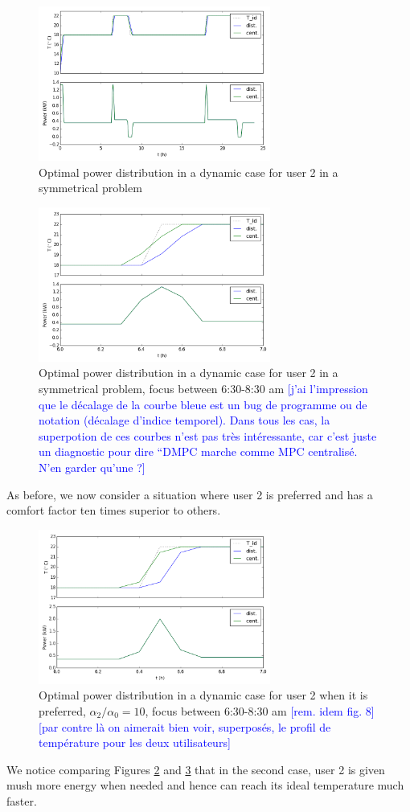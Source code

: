 \documentclass[conference]{IEEEtran}
\edef\hc{\string:}
\newcommand{\rem}[1]{\textcolor{blue}{[#1]}}
\begin{document}
\begin{figure}[H]
\centering
\includegraphics[width=3in]{dynDMPC_init.png}
\caption{Optimal power distribution in a dynamic case for user 2 in a symmetrical problem}
\label{dynDPBinit}
\end{figure}
\begin{figure}[H]
\centering
\includegraphics[width=3in]{dynDMPC_initZOOM.png}
\caption{Optimal power distribution in a dynamic case for user 2 in a symmetrical problem, focus between 6\hc 30-8\hc 30 am
\rem{j'ai l'impression que le décalage de la courbe bleue est un bug de programme ou de notation (décalage d'indice temporel).
Dans tous les cas, la superpotion de ces courbes n'est pas très intéressante, car c'est juste un diagnostic pour dire ``DMPC marche comme MPC centralisé. N'en garder qu'une ?}
}
\label{dynDPBinit}
\end{figure}

As before, we now consider a situation where user 2 is preferred and has a comfort factor ten times superior to others. 
 
\begin{figure}[H]
\centering
\includegraphics[width=3in]{dynDMPC_chtZOOM.png}
\caption{Optimal power distribution in a dynamic case for user 2 when it is preferred, $\alpha_2 / \alpha_0 = 10$, focus between 6\hc 30-8\hc 30 am
\rem{rem. idem fig. 8}
\rem{par contre là on aimerait bien voir, superposés, le profil de température pour les deux utilisateurs}
}
\label{dynDPBcom}
\end{figure}
 We notice comparing Figures \ref{dynDPBinit} and \ref{dynDPBcom} that in the second case, user 2 is given mush more energy when needed and hence can reach its ideal temperature much faster.
\end{document}
